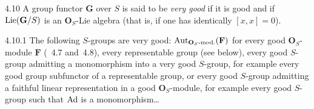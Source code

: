 \begin{definition}{4.10}\label{II.4.10}
A group functor \(\mathbf{G}\) over \(S\) is said to be \emph{very good} if it is good
and if \(\operatorname{Lie}(\mathbf{G}/S)\) is an \(\mathbf{O}_{S}\)-Lie algebra (that is, if one
has identically \([x,x]=0\)).
\end{definition}

\begin{examples}{4.10.1}\label{II.4.10.1}
The following \(S\)-groups are very good:
\(\operatorname{Aut}_{\mathbf{O}_{S}\textup{-mod.}}(\mathbf{F})\) for every good
\(\mathbf{O}_{S}\)-module \(\mathbf{F}\) (\cf~4.7 and~4.8), every representable group
(see below), every good \(S\)-group admitting a monomorphism into a very good
\(S\)-group, for example every good group subfunctor of a representable group, or
every good \(S\)-group admitting a faithful linear representation in a good
\(\mathbf{O}_{S}\)-module, for example every good \(S\)-group such that \(\operatorname{Ad}\) is a
monomorphism\ldots
\end{examples}
